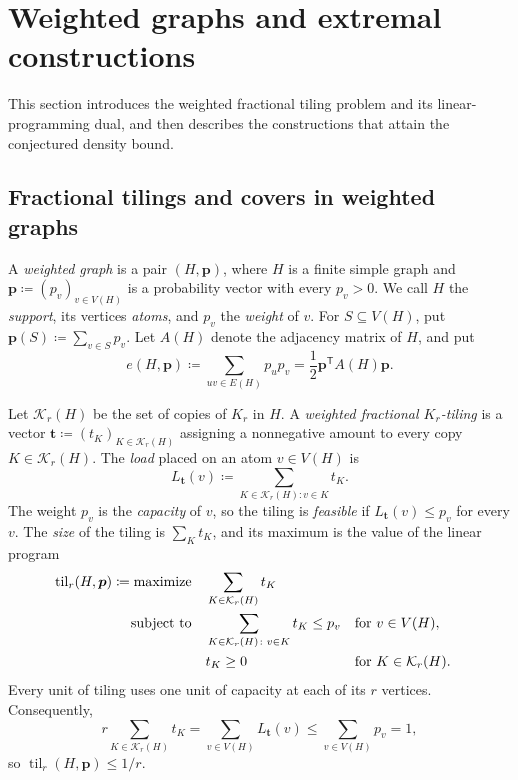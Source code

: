 \documentclass[10pt]{article}
\numberwithin{equation}{section}
\newcommand{\til}{\operatorname{til}}
\newcommand{\vct}[1]{\boldsymbol{#1}}
\begin{document}
\section{Weighted graphs and extremal constructions}\label{sec:weighted-constructions}

This section introduces the weighted fractional tiling problem and its linear-programming dual, and then describes the constructions that attain the conjectured density bound.

\subsection{Fractional tilings and covers in weighted graphs}\label{sec:weighted-preliminaries}

A \emph{weighted graph} is a pair $(H,\vct p)$, where $H$ is a finite simple graph and $\vct p\coloneqq(p_v)_{v\in V(H)}$ is a probability vector with every $p_v>0$.  We call $H$ the \emph{support}, its vertices \emph{atoms}, and $p_v$ the \emph{weight} of $v$.  For $S\subseteq V(H)$, put $\vct p(S)\coloneqq\sum_{v\in S}p_v$.  Let $A(H)$ denote the adjacency matrix of $H$, and put
\[
 e(H,\vct p)\coloneqq\sum_{uv\in E(H)}p_up_v
       =\frac12\vct p^{\mathsf T}A(H)\vct p.
\]

Let $\mathcal K_r(H)$ be the set of copies of $K_r$ in $H$.  A \emph{weighted fractional $K_r$-tiling} is a vector $\vct t\coloneqq(t_K)_{K\in\mathcal K_r(H)}$ assigning a nonnegative amount to every copy $K\in\mathcal K_r(H)$.  The \emph{load} placed on an atom $v\in V(H)$ is
\[
 L_{\vct t}(v)\coloneqq\sum_{K\in\mathcal K_r(H)\colon v\in K}t_K.
\]
The weight $p_v$ is the \emph{capacity} of $v$, so the tiling is \emph{feasible} if $L_{\vct t}(v)\le p_v$ for every $v$.  The \emph{size} of the tiling is $\sum_Kt_K$, and its maximum is the value of the linear program
\begin{equation}\label{eq:weighted-tiling-lp}
\begin{aligned}
 \til_r(H,\vct p)\coloneqq\text{\rm maximize}\quad
   &\sum_{K\in\mathcal K_r(H)}t_K\\
 \text{\rm subject to}\quad
   &\sum_{K\in\mathcal K_r(H)\colon v\in K}t_K\le p_v
       &&\text{for }v\in V(H),\\
   &t_K\ge0
       &&\text{for }K\in\mathcal K_r(H).
\end{aligned}
\end{equation}
Every unit of tiling uses one unit of capacity at each of its $r$ vertices.  Consequently,
\[
 r\sum_{K\in\mathcal K_r(H)}t_K
 =\sum_{v\in V(H)}L_{\vct t}(v)
 \le\sum_{v\in V(H)}p_v=1,
\]
so $\til_r(H,\vct p)\le1/r$.
\end{document}
